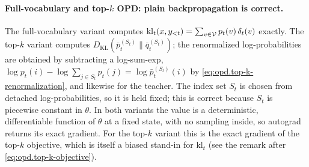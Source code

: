 \paragraph{Full-vocabulary and top-$k$ OPD: plain backpropagation is correct.}
The full-vocabulary variant computes $\mathrm{kl}_t(x,y_{<t})=\sum_{v\in{\cal V}}p_t(v)\,\delta_t(v)$
exactly. The top-$k$ variant computes
$D_{\mathrm{KL}}(\bar p_t^{(S_t)}\|\bar q_t^{(S_t)})$; the renormalized log-probabilities
are obtained by subtracting a log-sum-exp,
$\log p_t(i)-\log\sum_{j\in S_t}p_t(j)=\log\bar p_t^{(S_t)}(i)$ by
\eqref{eq:opd.top-k-renormalization}, and likewise for the teacher. The index set $S_t$
is chosen from detached log-probabilities, so it is held fixed; this is correct
because $S_t$ is piecewise constant in $\theta$. In both variants the value is a
deterministic, differentiable function of $\theta$ at a fixed state, with no sampling
inside, so autograd returns its exact gradient. For the top-$k$ variant this is the
exact gradient of the top-$k$ objective, which is itself a biased stand-in for
$\mathrm{kl}_t$ (see the remark after \eqref{eq:opd.top-k-objective}).

